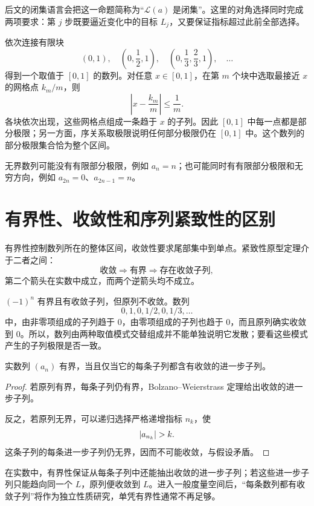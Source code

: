 后文的闭集语言会把这一命题简称为“\(\mathcal L(a)\) 是闭集”。这里的对角选择同时完成两项要求：第 \(j\) 步既要逼近变化中的目标 \(L_j\)，又要保证指标超过此前全部选择。

\begin{example}[部分极限可以充满一个区间]
依次连接有限块
\[
 (0,1),\quad
 \left(0,\frac12,1\right),\quad
 \left(0,\frac13,\frac23,1\right),\quad\ldots
\]
得到一个取值于 \([0,1]\) 的数列。对任意 \(x\in[0,1]\)，在第
\(m\) 个块中选取最接近 \(x\) 的网格点 \(k_m/m\)，则
\[
 \left|x-\frac{k_m}{m}\right|\le\frac1m.
\]
各块依次出现，这些网格点组成一条趋于 \(x\) 的子列。因此
\([0,1]\) 中每一点都是部分极限；另一方面，序关系取极限说明任何部分极限仍在 \([0,1]\) 中。这个数列的部分极限集合恰为整个区间。
\end{example}

无界数列可能没有有限部分极限，例如 \(a_n=n\)；也可能同时有有限部分极限和无穷方向，例如 \(a_{2n}=0\)、\(a_{2n-1}=n\)。

\section{有界性、收敛性和序列紧致性的区别}


有界性控制数列所在的整体区间，收敛性要求尾部集中到单点。紧致性原型定理介于二者之间：
\[
 \text{收敛}\Longrightarrow\text{有界}
 \Longrightarrow\text{存在收敛子列},
\]
第二个箭头在实数中成立，而两个逆箭头均不成立。

\begin{counterexample}
\((-1)^n\) 有界且有收敛子列，但原列不收敛。数列
\[
 0,1,0,1/2,0,1/3,\ldots
\]
中，由非零项组成的子列趋于 \(0\)，由零项组成的子列也趋于 \(0\)，而且原列确实收敛到 \(0\)。所以，数列由两种取值模式交替组成并不能单独说明它发散；要看这些模式产生的子列极限是否一致。
\end{counterexample}

\begin{proposition}[有界性的抽取刻画]
实数列 \((a_n)\) 有界，当且仅当它的每条子列都含有收敛的进一步子列。
\end{proposition}

\begin{proof}
若原列有界，每条子列仍有界，Bolzano--Weierstrass 定理给出收敛的进一步子列。

反之，若原列无界，可以递归选择严格递增指标 \(n_k\)，使
\[
 \abs{a_{n_k}}>k.
\]
这条子列的每条进一步子列仍无界，因而不可能收敛，与假设矛盾。
\end{proof}

在实数中，有界性保证从每条子列中还能抽出收敛的进一步子列；若这些进一步子列只能趋向同一个 \(L\)，原列便收敛到 \(L\)。进入一般度量空间后，“每条数列都有收敛子列”将作为独立性质研究，单凭有界性通常不再足够。

